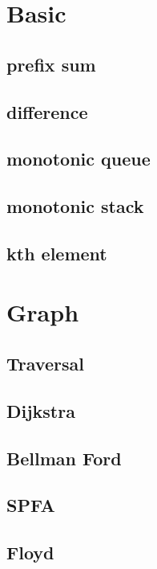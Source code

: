 \section{Basic}
    \subsection{prefix sum}
        
    \subsection{difference}
        
    \subsection{monotonic queue}
        
    \subsection{monotonic stack}
        
    \subsection{kth element}
        

\section{Graph}
    \subsection{Traversal}
        
    \subsection{Dijkstra}
        
    \subsection{Bellman Ford}
        
    \subsection{SPFA}
        
    \subsection{Floyd}
        
